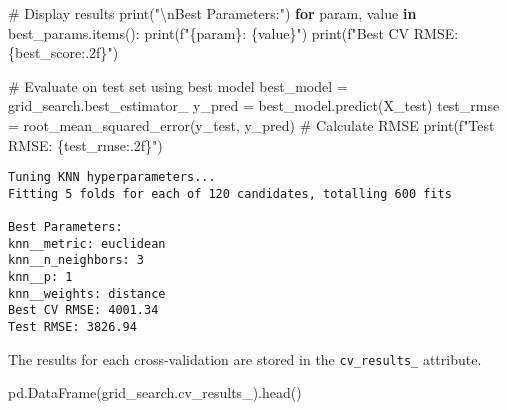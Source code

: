\documentclass[
  letterpaper,
  DIV=11,
  numbers=noendperiod]{scrreprt}
\newenvironment{Shaded}{\begin{snugshade}}{\end{snugshade}}
\newcommand{\BuiltInTok}[1]{\textcolor[rgb]{0.00,0.23,0.31}{#1}}
\newcommand{\CharTok}[1]{\textcolor[rgb]{0.13,0.47,0.30}{#1}}
\newcommand{\CommentTok}[1]{\textcolor[rgb]{0.37,0.37,0.37}{#1}}
\newcommand{\ControlFlowTok}[1]{\textcolor[rgb]{0.00,0.23,0.31}{\textbf{#1}}}
\newcommand{\KeywordTok}[1]{\textcolor[rgb]{0.00,0.23,0.31}{\textbf{#1}}}
\newcommand{\NormalTok}[1]{\textcolor[rgb]{0.00,0.23,0.31}{#1}}
\newcommand{\OperatorTok}[1]{\textcolor[rgb]{0.37,0.37,0.37}{#1}}
\newcommand{\SpecialCharTok}[1]{\textcolor[rgb]{0.37,0.37,0.37}{#1}}
\newcommand{\SpecialStringTok}[1]{\textcolor[rgb]{0.13,0.47,0.30}{#1}}
\newcommand{\StringTok}[1]{\textcolor[rgb]{0.13,0.47,0.30}{#1}}
\begin{document}
\begin{Shaded}
\begin{Highlighting}[]
\CommentTok{\# Display results}
\BuiltInTok{print}\NormalTok{(}\StringTok{"}\CharTok{\textbackslash{}n}\StringTok{Best Parameters:"}\NormalTok{)}
\ControlFlowTok{for}\NormalTok{ param, value }\KeywordTok{in}\NormalTok{ best\_params.items():}
    \BuiltInTok{print}\NormalTok{(}\SpecialStringTok{f"}\SpecialCharTok{\{}\NormalTok{param}\SpecialCharTok{\}}\SpecialStringTok{: }\SpecialCharTok{\{}\NormalTok{value}\SpecialCharTok{\}}\SpecialStringTok{"}\NormalTok{)}
\BuiltInTok{print}\NormalTok{(}\SpecialStringTok{f"Best CV RMSE: }\SpecialCharTok{\{}\NormalTok{best\_score}\SpecialCharTok{:.2f\}}\SpecialStringTok{"}\NormalTok{)}

\CommentTok{\# Evaluate on test set using best model}
\NormalTok{best\_model }\OperatorTok{=}\NormalTok{ grid\_search.best\_estimator\_}
\NormalTok{y\_pred }\OperatorTok{=}\NormalTok{ best\_model.predict(X\_test)}
\NormalTok{test\_rmse }\OperatorTok{=}\NormalTok{ root\_mean\_squared\_error(y\_test, y\_pred)  }\CommentTok{\# Calculate RMSE}
\BuiltInTok{print}\NormalTok{(}\SpecialStringTok{f"Test RMSE: }\SpecialCharTok{\{}\NormalTok{test\_rmse}\SpecialCharTok{:.2f\}}\SpecialStringTok{"}\NormalTok{)}
\end{Highlighting}
\end{Shaded}

\begin{verbatim}
Tuning KNN hyperparameters...
Fitting 5 folds for each of 120 candidates, totalling 600 fits

Best Parameters:
knn__metric: euclidean
knn__n_neighbors: 3
knn__p: 1
knn__weights: distance
Best CV RMSE: 4001.34
Test RMSE: 3826.94
\end{verbatim}

The results for each cross-validation are stored in the
\texttt{cv\_results\_} attribute.

\begin{Shaded}
\begin{Highlighting}[]
\NormalTok{pd.DataFrame(grid\_search.cv\_results\_).head()}
\end{Highlighting}
\end{Shaded}
\end{document}
